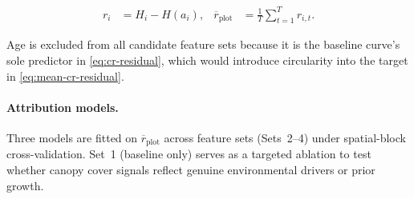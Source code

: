 \documentclass[11pt,a4paper]{report}
\begin{document}
\begin{subequations}
\label{eq:target-construction}
\begin{align}
r_i &= H_i - H(a_i), \label{eq:cr-residual} &
\overline{r}_{\text{plot}} &= \frac{1}{T}\sum_{t=1}^{T} r_{i,t}. \label{eq:mean-cr-residual}
\end{align}
\end{subequations}

Age is excluded from all candidate feature sets because it is the baseline curve's sole predictor in \eqref{eq:cr-residual}, which would introduce circularity into the target in \eqref{eq:mean-cr-residual}.

\paragraph*{Attribution models.}
Three models are fitted on $\overline{r}_{\text{plot}}$ across feature sets (Sets~2--4) under spatial-block cross-validation. Set~1 (baseline only) serves as a targeted ablation to test whether canopy cover signals reflect genuine environmental drivers or prior growth.
\end{document}
